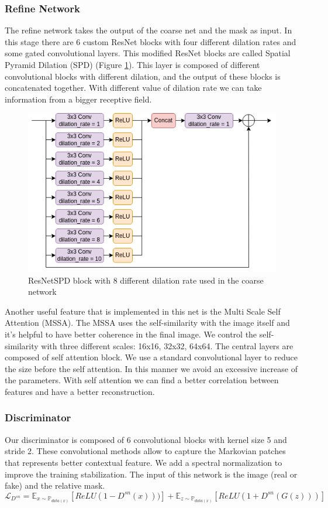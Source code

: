 \documentclass[10pt,twocolumn,letterpaper]{article}
\begin{document}
\subsubsection{Refine Network}
The refine network takes the output of the coarse net and the mask as input.
In this stage there are 6 custom ResNet blocks with four different dilation rates and some
gated convolutional layers.
This modified ResNet blocks are called Spatial Pyramid Dilation (SPD) (Figure
\ref{fig:rnspd}). This layer is composed of different convolutional blocks with
different dilation, and the output of these blocks is concatenated together.
With different value of dilation rate we can take information from a bigger
receptive field.
\begin{figure}
  \includegraphics[width=1\linewidth]{img/SPDresnet.png}
  \caption{ResNetSPD block with 8 different dilation rate used in the coarse
  network}
  \label{fig:rnspd}
\end{figure}
Another useful feature that is implemented in this net is the Multi Scale Self
Attention (MSSA). The MSSA uses the self-similarity with the image itself
and it's helpful to have better coherence in the final image. We control
the self-similarity with three different scales: 16x16, 32x32, 64x64.
The central layers are composed of self attention block. We use a standard
convolutional layer to reduce the size before the self attention. In this manner
we avoid an excessive increase of the parameters. With self attention we can
find a better correlation between features and have a better reconstruction.
\subsubsection{Discriminator}
Our discriminator is composed of 6 convolutional blocks with kernel size 5 and
stride 2.
These convolutional methods allow to capture the Markovian patches that
represents better contextual feature\cite{li2016precomputed}.
We add a spectral normalization to improve the training
stabilization\cite{miyato2018spectral}.
The input of this network is the image (real or fake) and the relative mask.
\begin{dmath}
        \mathcal{L}_{D^{sn}}= \mathbb{E}_{x\sim \mathbb{P}_{data(x)}} \left [
          ReLU(1-D^{sn}(x))) \right ] + \mathbb{E}_{z\sim \mathbb{P}_{data(x)}}
        \left [ ReLU(1+D^{sn}(G(z)))\right ]
\end{dmath}
\end{document}

